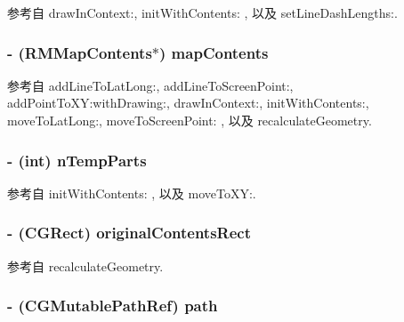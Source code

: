 参考自 draw\-In\-Context\-:, init\-With\-Contents\-: , 以及 set\-Line\-Dash\-Lengths\-:.

\hypertarget{interface_r_m_path_ad95b46462e03361c8dd1793ed93358bf}{
\subsubsection[{map\-Contents}]{\setlength{\rightskip}{0pt plus 5cm}-\/ ({\bf R\-M\-Map\-Contents}$\ast$) map\-Contents\hspace{0.3cm}{\ttfamily [protected]}}}\label{interface_r_m_path_ad95b46462e03361c8dd1793ed93358bf}


参考自 add\-Line\-To\-Lat\-Long\-:, add\-Line\-To\-Screen\-Point\-:, add\-Point\-To\-X\-Y\-:with\-Drawing\-:, draw\-In\-Context\-:, init\-With\-Contents\-:, move\-To\-Lat\-Long\-:, move\-To\-Screen\-Point\-: , 以及 recalculate\-Geometry.

\hypertarget{interface_r_m_path_a7c6712af40b4154351635f68812b001c}{
\subsubsection[{n\-Temp\-Parts}]{\setlength{\rightskip}{0pt plus 5cm}-\/ (int) n\-Temp\-Parts\hspace{0.3cm}{\ttfamily [protected]}}}\label{interface_r_m_path_a7c6712af40b4154351635f68812b001c}


参考自 init\-With\-Contents\-: , 以及 move\-To\-X\-Y\-:.

\hypertarget{interface_r_m_path_a94e057a30ec95a4d5b29d32db112ed68}{
\subsubsection[{original\-Contents\-Rect}]{\setlength{\rightskip}{0pt plus 5cm}-\/ (C\-G\-Rect) original\-Contents\-Rect\hspace{0.3cm}{\ttfamily [protected]}}}\label{interface_r_m_path_a94e057a30ec95a4d5b29d32db112ed68}


参考自 recalculate\-Geometry.

\hypertarget{interface_r_m_path_ae603ad2b9d405ea3eed4639f5fff4cd7}{
\subsubsection[{path}]{\setlength{\rightskip}{0pt plus 5cm}-\/ (C\-G\-Mutable\-Path\-Ref) path\hspace{0.3cm}{\ttfamily [protected]}}}\label{interface_r_m_path_ae603ad2b9d405ea3eed4639f5fff4cd7}


